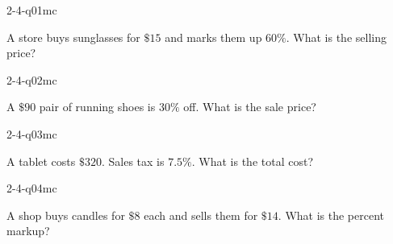 

\begin{practiceQuestion}{2-4-q01}{mc}
\begin{questionText}
A store buys sunglasses for $\$15$ and marks them up $60\%$. What is the selling price?
\end{questionText}
\end{practiceQuestion}

\begin{practiceQuestion}{2-4-q02}{mc}
\begin{questionText}
A $\$90$ pair of running shoes is $30\%$ off. What is the sale price?
\end{questionText}
\end{practiceQuestion}

\begin{practiceQuestion}{2-4-q03}{mc}
\begin{questionText}
A tablet costs $\$320$. Sales tax is $7.5\%$. What is the total cost?
\end{questionText}
\end{practiceQuestion}

\begin{practiceQuestion}{2-4-q04}{mc}
\begin{questionText}
A shop buys candles for $\$8$ each and sells them for $\$14$. What is the percent markup?
\end{questionText}
\end{practiceQuestion}

